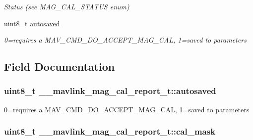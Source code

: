 \begin{DoxyCompactItemize}
\begin{DoxyCompactList}\small\item\em Status (see M\+A\+G\+\_\+\+C\+A\+L\+\_\+\+S\+T\+A\+T\+U\+S enum) \end{DoxyCompactList}\item 
uint8\+\_\+t \hyperlink{struct____mavlink__mag__cal__report__t_a741eddce316a3bf8651bc3450da1e588}{autosaved}
\begin{DoxyCompactList}\small\item\em 0=requires a M\+A\+V\+\_\+\+C\+M\+D\+\_\+\+D\+O\+\_\+\+A\+C\+C\+E\+P\+T\+\_\+\+M\+A\+G\+\_\+\+C\+A\+L, 1=saved to parameters \end{DoxyCompactList}\end{DoxyCompactItemize}


\subsection{Field Documentation}
\hypertarget{struct____mavlink__mag__cal__report__t_a741eddce316a3bf8651bc3450da1e588}{
\subsubsection[{autosaved}]{\setlength{\rightskip}{0pt plus 5cm}uint8\+\_\+t \+\_\+\+\_\+mavlink\+\_\+mag\+\_\+cal\+\_\+report\+\_\+t\+::autosaved}}\label{struct____mavlink__mag__cal__report__t_a741eddce316a3bf8651bc3450da1e588}


0=requires a M\+A\+V\+\_\+\+C\+M\+D\+\_\+\+D\+O\+\_\+\+A\+C\+C\+E\+P\+T\+\_\+\+M\+A\+G\+\_\+\+C\+A\+L, 1=saved to parameters 

\hypertarget{struct____mavlink__mag__cal__report__t_ac09a5430a41669586c9ab02212c87e86}{
\subsubsection[{cal\+\_\+mask}]{\setlength{\rightskip}{0pt plus 5cm}uint8\+\_\+t \+\_\+\+\_\+mavlink\+\_\+mag\+\_\+cal\+\_\+report\+\_\+t\+::cal\+\_\+mask}}\label{struct____mavlink__mag__cal__report__t_ac09a5430a41669586c9ab02212c87e86}



